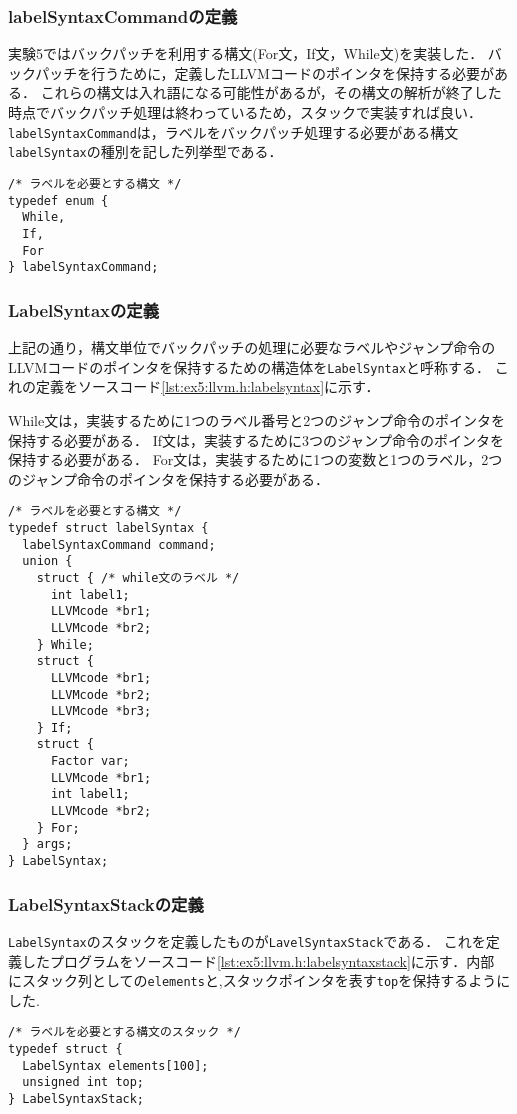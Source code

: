 \documentclass[uplatex]{jsarticle}
\begin{document}
\subsubsection {labelSyntaxCommandの定義}
実験5ではバックパッチを利用する構文(For文，If文，While文)を実装した．
バックパッチを行うために，定義したLLVMコードのポインタを保持する必要がある．
これらの構文は入れ語になる可能性があるが，その構文の解析が終了した時点でバックパッチ処理は終わっているため，スタックで実装すれば良い．
\verb#labelSyntaxCommand#は，ラベルをバックパッチ処理する必要がある構文\verb#labelSyntax#の種別を記した列挙型である．
\begin{lstlisting}[caption=labelSyntaxCommandの定義,label=lst:ex5:llvm.h:labelsyntaxcommand]
/* ラベルを必要とする構文 */
typedef enum {
  While,
  If,
  For
} labelSyntaxCommand;
\end{lstlisting}

\subsubsection {LabelSyntaxの定義}
上記の通り，構文単位でバックパッチの処理に必要なラベルやジャンプ命令のLLVMコードのポインタを保持するための構造体を\verb#LabelSyntax#と呼称する．
これの定義をソースコード\ref{lst:ex5:llvm.h:labelsyntax}に示す．

While文は，実装するために1つのラベル番号と2つのジャンプ命令のポインタを保持する必要がある．
If文は，実装するために3つのジャンプ命令のポインタを保持する必要がある．
For文は，実装するために1つの変数と1つのラベル，2つのジャンプ命令のポインタを保持する必要がある．
\begin{lstlisting}[caption=labelSyntaxの定義,label=lst:ex5:llvm.h:labelsyntax]
/* ラベルを必要とする構文 */
typedef struct labelSyntax {
  labelSyntaxCommand command;
  union {
    struct { /* while文のラベル */
      int label1;
      LLVMcode *br1;
      LLVMcode *br2;
    } While;
    struct {
      LLVMcode *br1;
      LLVMcode *br2;
      LLVMcode *br3;
    } If;
    struct {
      Factor var;
      LLVMcode *br1;
      int label1;
      LLVMcode *br2;
    } For;
  } args;
} LabelSyntax;
\end{lstlisting}

\subsubsection {LabelSyntaxStackの定義}
\verb#LabelSyntax#のスタックを定義したものが\verb#LavelSyntaxStack#である．
これを定義したプログラムをソースコード\ref{lst:ex5:llvm.h:labelsyntaxstack}に示す．内部
にスタック列としての\verb#elements#と,スタックポインタを表す\verb#top#を保持するようにした.
\begin{lstlisting}[caption=labelSyntaxStackの定義,label=lst:ex5:llvm.h:labelsyntaxstack]
/* ラベルを必要とする構文のスタック */
typedef struct {
  LabelSyntax elements[100];
  unsigned int top;
} LabelSyntaxStack;
\end{lstlisting}
\end{document}
